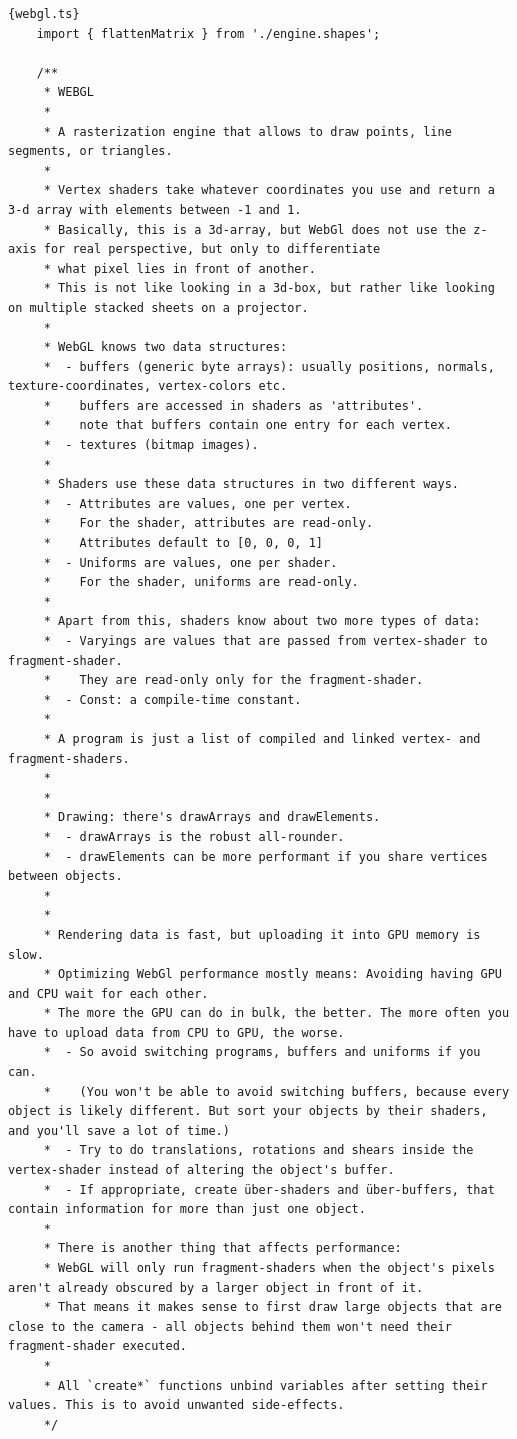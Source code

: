 \begin{lstlisting}{webgl.ts}
    import { flattenMatrix } from './engine.shapes';

    /**
     * WEBGL
     *
     * A rasterization engine that allows to draw points, line segments, or triangles.
     *
     * Vertex shaders take whatever coordinates you use and return a 3-d array with elements between -1 and 1.
     * Basically, this is a 3d-array, but WebGl does not use the z-axis for real perspective, but only to differentiate
     * what pixel lies in front of another.
     * This is not like looking in a 3d-box, but rather like looking on multiple stacked sheets on a projector.
     *
     * WebGL knows two data structures:
     *  - buffers (generic byte arrays): usually positions, normals, texture-coordinates, vertex-colors etc.
     *    buffers are accessed in shaders as 'attributes'.
     *    note that buffers contain one entry for each vertex.
     *  - textures (bitmap images).
     *
     * Shaders use these data structures in two different ways.
     *  - Attributes are values, one per vertex.
     *    For the shader, attributes are read-only.
     *    Attributes default to [0, 0, 0, 1]
     *  - Uniforms are values, one per shader.
     *    For the shader, uniforms are read-only.
     *
     * Apart from this, shaders know about two more types of data:
     *  - Varyings are values that are passed from vertex-shader to fragment-shader.
     *    They are read-only only for the fragment-shader.
     *  - Const: a compile-time constant.
     *
     * A program is just a list of compiled and linked vertex- and fragment-shaders.
     *
     *
     * Drawing: there's drawArrays and drawElements.
     *  - drawArrays is the robust all-rounder.
     *  - drawElements can be more performant if you share vertices between objects.
     *
     *
     * Rendering data is fast, but uploading it into GPU memory is slow.
     * Optimizing WebGl performance mostly means: Avoiding having GPU and CPU wait for each other.
     * The more the GPU can do in bulk, the better. The more often you have to upload data from CPU to GPU, the worse.
     *  - So avoid switching programs, buffers and uniforms if you can.
     *    (You won't be able to avoid switching buffers, because every object is likely different. But sort your objects by their shaders, and you'll save a lot of time.)
     *  - Try to do translations, rotations and shears inside the vertex-shader instead of altering the object's buffer.
     *  - If appropriate, create über-shaders and über-buffers, that contain information for more than just one object.
     *
     * There is another thing that affects performance:
     * WebGL will only run fragment-shaders when the object's pixels aren't already obscured by a larger object in front of it.
     * That means it makes sense to first draw large objects that are close to the camera - all objects behind them won't need their fragment-shader executed.
     *
     * All `create*` functions unbind variables after setting their values. This is to avoid unwanted side-effects.
     */
    

\end{lstlisting}
